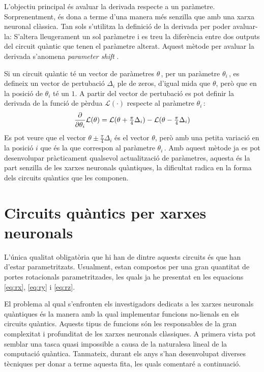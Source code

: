 L'objectiu principal és avaluar la derivada respecte a un paràmetre. Sorprenentment, és dona a terme d'una manera més senzilla que amb una xarxa neuronal clàssica. Tan sols s'utilitza la definició de la derivada per poder avaluar-la: S'altera lleugerament un sol paràmetre i es treu la diferència entre dos outputs del circuit quàntic que tenen el paràmetre alterat. Aquest mètode per avaluar la derivada s'anomena \textit{parameter shift} \cite{tfq, shift_parameter_harrow_2019}.

Si un circuit quàntic té un vector de paràmetres $\theta\,$, per un paràmetre $\theta_{i}\,$, es defineix un vector de pertubació $\Delta_i$ ple de zeros, d'igual mida que $\theta$, però que en la posició de $\theta_i$ té un $1$. A partir del vector de pertubació es pot definir la derivada de la funció de pèrdua $\mathcal{L}(\cdot)$ respecte al paràmetre $\theta_{i}\,$:
$$
\pdv{\theta_i} \mathcal{L}(\theta) = \mathcal{L}(\theta + \tfrac{\pi}{4}\Delta_i) - \mathcal{L}(\theta - \tfrac{\pi}{4}\Delta_i)
$$
Es pot veure que el vector $\theta \pm \frac{\pi}{4}\Delta_i$ és el vector $\theta$, però amb una petita variació en la posició $i$ que és la que correspon al paràmetre $\theta_i\,$. Amb aquest mètode ja es pot desenvolupar pràcticament qualsevol actualització de paràmetres, aquesta és la part senzilla de les xarxes neuronals quàntiques, la dificultat radica en la forma dels circuits quàntics que les componen.

\section{Circuits quàntics per xarxes neuronals}
\label{qcircuits}
L'única qualitat obligatòria que hi han de dintre aquests circuits és que han d'estar parametritzats. Usualment, estan compostos per una gran quantitat de portes rotacionals parametritzades, les quals ja he presentat en les equacions \ref{eq:rx}, \ref{eq:ry} i \ref{eq:rz}.

El problema al qual s'enfronten els investigadors dedicats a les xarxes neuronals quàntiques és la manera amb la qual implementar funcions no-lienals en els circuits quàntics. Aquests tipus de funcions són les responsables de la gran complexitat i profunditat de les xarxes neuronals clàssiques. A primera vista pot semblar una tasca quasi impossible a causa de la naturalesa lineal de la computació quàntica. Tanmateix, durant els anys s'han desenvolupat diverses tècniques per donar a terme aquesta fita, les quals comentaré a continuació.

